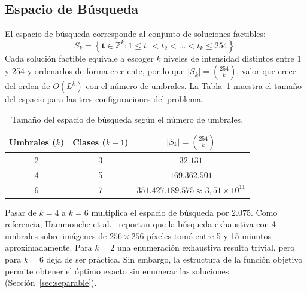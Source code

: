 \documentclass[letter, 10pt]{article}
\begin{document}
\subsection{Espacio de B\'usqueda}
El espacio de b\'usqueda corresponde al conjunto de soluciones factibles:
\begin{equation}
    S_k = \left\{ \mathbf{t} \in \mathbb{Z}^k : 1 \leq t_1 < t_2 < \dots < t_k \leq 254 \right\}.
\end{equation}
Cada soluci\'on factible equivale a escoger $k$ niveles de intensidad distintos entre 1 y 254 y ordenarlos de forma creciente, por lo que $|S_k| = \binom{254}{k}$, valor que crece del orden de $O(L^k)$ con el n\'umero de umbrales. La Tabla~\ref{tab:espacio} muestra el tama\~no del espacio para las tres configuraciones del problema.

\begin{table}[h]
    \centering
    \begin{tabular}{ccc}
        \hline
        Umbrales ($k$) & Clases ($k+1$) & $|S_k| = \binom{254}{k}$ \\
        \hline
        2 & 3 & $32.131$ \\
        4 & 5 & $169.362.501$ \\
        6 & 7 & $351.427.189.575 \approx 3{,}51 \times 10^{11}$ \\
        \hline
    \end{tabular}
    \caption{Tama\~no del espacio de b\'usqueda seg\'un el n\'umero de umbrales.}
    \label{tab:espacio}
\end{table}

Pasar de $k = 4$ a $k = 6$ multiplica el espacio de b\'usqueda por $2.075$. Como referencia, Hammouche et al.~\cite{Hammouche2010Comparative} reportan que la b\'usqueda exhaustiva con 4 umbrales sobre im\'agenes de $256 \times 256$ p\'ixeles tom\'o entre 5 y 15 minutos aproximadamente. Para $k = 2$ una enumeración exhaustiva resulta trivial, pero para $k = 6$ deja de ser práctica. Sin embargo, la estructura de la función objetivo permite obtener el óptimo exacto sin enumerar las soluciones (Sección~\ref{sec:separable}).
\end{document}
